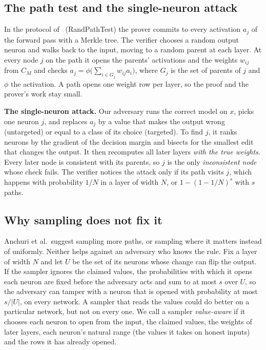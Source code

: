 \documentclass[sigconf,nonacm]{acmart}
\newcommand{\para}[1]{\par\noindent\textbf{#1}\quad}
\begin{document}
\subsection{The path test and the single-neuron attack}
\label{sec:attack}
In the protocol of~\cite{anchuri2026verifiable} (RandPathTest) the prover commits to every
activation $a_j$ of the forward pass with a Merkle tree. The verifier chooses a random output
neuron and walks back to the input, moving to a random parent at each layer. At every node $j$ on
the path it opens the parents' activations and the weights $w_{ij}$ from $C_M$ and checks
$a_j = \phi\big(\sum_{i \in G_j} w_{ij} a_i\big)$, where $G_j$ is the set of parents of $j$ and
$\phi$ the activation. A path opens one weight row per layer, so the proof and the prover's work
stay small.

\para{The single-neuron attack.} Our adversary runs the correct model on $x$, picks one neuron
$j$, and replaces $a_j$ by a value that makes the output wrong (untargeted) or equal to a class of
its choice (targeted). To find $j$, it ranks neurons by the gradient of the decision margin and bisects
for the smallest edit that changes the output. It then recomputes all later layers \emph{with the true weights}. Every
later node is consistent with its parents, so $j$ is the only
\emph{inconsistent node} whose check fails. The verifier notices the attack
only if its path visits $j$, which happens with probability $1/N$ in a layer of width $N$, or
$1-(1-1/N)^s$ with $s$ paths.

\subsection{Why sampling does not fix it}
\label{sec:sampling}
Anchuri et al.\ suggest sampling more paths, or sampling where it matters instead of uniformly.
Neither helps against an adversary who knows the rule. Fix a layer of width $N$ and let $U$ be the
set of its neurons whose change can flip the output. If the sampler ignores the claimed values, the
probabilities with which it opens each neuron are fixed before the adversary acts and sum to at
most $s$ over $U$, so the adversary can tamper with a neuron that is opened with probability at
most $s/|U|$, on every network. A sampler that reads the values could do better on a particular
network, but not on every one. We call a sampler \emph{value-aware} if it chooses each neuron to
open from the input, the claimed values, the weights of later layers, each neuron's natural range
(the values it takes on honest inputs) and the rows it has already opened.
\end{document}
